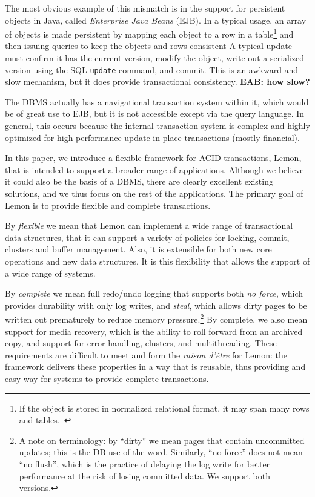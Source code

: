\documentclass[letterpaper,twocolumn,english]{article}
\newcommand{\yad}{Lemon\xspace}
\newcommand{\eab}[1]{{\bf EAB: #1}}
\begin{document}
The most obvious example of this mismatch is in the support for
persistent objects in Java, called {\em Enterprise Java Beans}
(EJB). In a typical usage, an array of objects is made persistent by
mapping each object to a row in a table\footnote{If the object is
stored in normalized relational format, it may span many rows and tables.~\cite{Hibernate}} 
and then issuing queries to
keep the objects and rows consistent  A typical update must confirm
it has the current version, modify the object, write out a serialized
version using the SQL {\tt update} command, and commit.  This is an
awkward and slow mechanism, but it does provide transactional
consistency. \eab{how slow?}

The DBMS actually has a navigational transaction system within it,
which would be of great use to EJB, but it is not accessible except
via the query language.  In general, this occurs because the internal
transaction system is complex and highly optimized for
high-performance update-in-place transactions (mostly financial).

In this paper, we introduce a flexible framework for ACID
transactions, \yad, that is intended to support a broader range of
applications.  Although we believe it could also be the basis of a
DBMS, there are clearly excellent existing solutions, and we thus
focus on the rest of the applications.  The primary goal of \yad is to
provide flexible and complete transactions.

By {\em flexible} we mean that \yad can implement a wide range of
transactional data structures, that it can support a variety of
policies for locking, commit, clusters and buffer management. Also,
it is extensible for both new core operations and new data
structures.  It is this flexibility that allows the support of a wide
range of systems.

By {\em complete} we mean full redo/undo logging that supports both
{\em no force}, which provides durability with only log writes, and
{\em steal}, which allows dirty pages to be written out prematurely to
reduce memory pressure.\footnote{A note on terminology: by ``dirty''
we mean pages that contain uncommitted updates; this is the DB use of
the word. Similarly, ``no force'' does not mean ``no flush'', which is
the practice of delaying the log write for better performance at the
risk of losing committed data. We support both versions.} By complete,
we also mean support for media recovery, which is the ability to roll
forward from an archived copy, and support for error-handling,
clusters, and multithreading.  These requirements are difficult to
meet and form the {\em raison d'\^{e}tre} for \yad: the framework delivers
these properties in a way that is reusable, thus providing and easy
way for systems to provide complete transactions.
\end{document}
